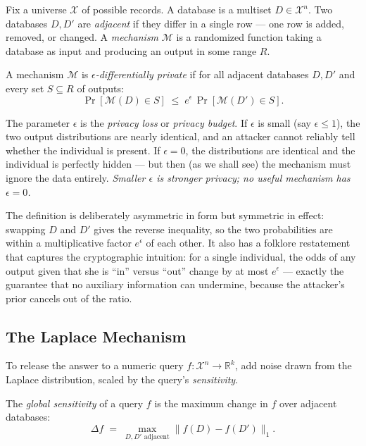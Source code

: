 Fix a universe $\mathcal{X}$ of possible records. A database is a multiset $D \in \mathcal{X}^n$. Two databases $D, D'$ are \emph{adjacent} if they differ in a single row --- one row is added, removed, or changed. A \emph{mechanism} $\mathcal{M}$ is a randomized function taking a database as input and producing an output in some range $R$. 

\begin{definition}
A mechanism $\mathcal{M}$ is \emph{$\epsilon$-differentially private} if for all adjacent databases $D, D'$ and every set $S \subseteq R$ of outputs:
\[
\Pr[\mathcal{M}(D) \in S] \;\le\; e^{\epsilon}\, \Pr[\mathcal{M}(D') \in S].
\]
\end{definition}

The parameter $\epsilon$ is the \emph{privacy loss} or \emph{privacy budget}.  If $\epsilon$ is small (say $\epsilon \le 1$), the two output distributions are nearly identical, and an attacker cannot reliably tell whether the individual is present. If $\epsilon = 0$, the distributions are identical and the individual is perfectly hidden --- but then (as we shall see) the mechanism must ignore the data entirely. \emph{Smaller $\epsilon$ is stronger privacy; no useful mechanism has $\epsilon = 0$.}

The definition is deliberately asymmetric in form but symmetric in effect: swapping $D$ and $D'$ gives the reverse inequality, so the two probabilities are within a multiplicative factor $e^{\epsilon}$ of each other. It also has a folklore restatement that captures the cryptographic intuition: for a single individual, the odds of any output given that she is ``in'' versus ``out'' change by at most $e^{\epsilon}$ --- exactly the guarantee that no auxiliary information can undermine, because the attacker's prior cancels out of the ratio. 

\subsection{The Laplace Mechanism}
\label{sec:dp:laplace}

To release the answer to a numeric query $f : \mathcal{X}^n \to \mathbb{R}^k$, add noise drawn from the Laplace distribution, scaled by the query's \emph{sensitivity}. 

\begin{definition}
The \emph{global sensitivity} of a query $f$ is the maximum change in $f$ over adjacent databases:
\[
\Delta f \;=\; \max_{D, D' \text{ adjacent}} \bigl\| f(D) - f(D') \bigr\|_1 .
\]
\end{definition}

